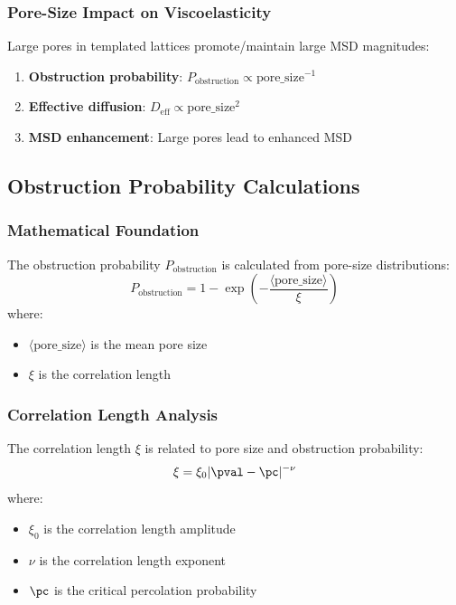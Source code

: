 \subsubsection{Pore-Size Impact on Viscoelasticity}
Large pores in templated lattices promote/maintain large MSD magnitudes:

\begin{enumerate}
    \item \textbf{Obstruction probability}: $P_{\text{obstruction}} \propto \text{pore\_size}^{-1}$
    \item \textbf{Effective diffusion}: $D_{\text{eff}} \propto \text{pore\_size}^2$
    \item \textbf{MSD enhancement}: Large pores lead to enhanced MSD
\end{enumerate}

\subsection{Obstruction Probability Calculations}

\subsubsection{Mathematical Foundation}
The obstruction probability $P_{\text{obstruction}}$ is calculated from pore-size distributions:
\begin{equation}
P_{\text{obstruction}} = 1 - \exp\left(-\frac{\langle \text{pore\_size} \rangle}{\xi}\right)
\end{equation}
where:
\begin{itemize}
    \item $\langle \text{pore\_size} \rangle$ is the mean pore size
    \item $\xi$ is the correlation length
\end{itemize}

\subsubsection{Correlation Length Analysis}
The correlation length $\xi$ is related to pore size and obstruction probability:
\begin{equation}
\xi = \xi_0 |\pval - \pc|^{-\nu}
\end{equation}
where:
\begin{itemize}
    \item $\xi_0$ is the correlation length amplitude
    \item $\nu$ is the correlation length exponent
    \item $\pc$ is the critical percolation probability
\end{itemize}

